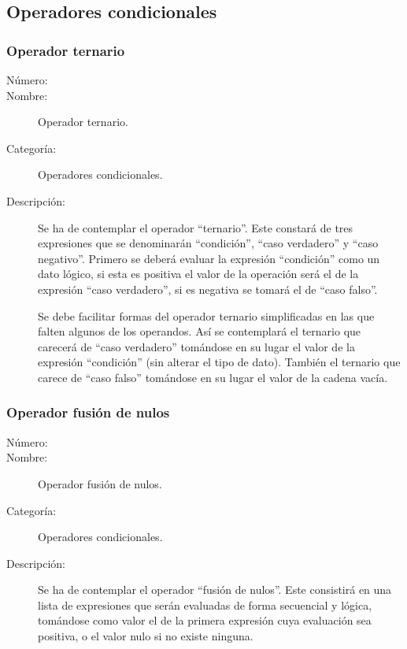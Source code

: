 \subsection{Operadores condicionales}
\subsubsection{Operador ternario}
\begin{framed}
	\begin{description}
		\item [Número:] \cn
		\item [Nombre:] Operador ternario.
		\item [Categoría:] Operadores condicionales.
		\item [Descripción:] Se ha de contemplar el operador ``ternario''. Este constará de tres expresiones que se denominarán
		``condición'', ``caso verdadero'' y ``caso negativo''. Primero se deberá evaluar la expresión ``condición'' como un
		dato lógico, si esta es positiva el valor de la operación será el de la expresión ``caso verdadero'', si es negativa
		se tomará el de ``caso falso''.
		
		Se debe facilitar formas del operador ternario simplificadas en las que falten algunos
		de los operandos. Así se contemplará el ternario que carecerá de ``caso verdadero'' tomándose en su lugar
		el valor de la expresión ``condición'' (sin alterar el tipo de dato). También el ternario que carece de ``caso falso''
		tomándose en su lugar el valor de la cadena vacía.
	\end {description}
\end{framed}

\subsubsection{Operador fusión de nulos}
\begin{framed}
	\begin{description}
		\item [Número:] \cn
		\item [Nombre:] Operador fusión de nulos.
		\item [Categoría:] Operadores condicionales.
		\item [Descripción:] Se ha de contemplar el operador ``fusión de nulos''. Este consistirá en una lista de expresiones que serán
		evaluadas de forma secuencial y lógica, tomándose como valor el de la primera expresión
		cuya evaluación sea positiva, o el valor nulo si no existe ninguna.
	\end {description}
\end{framed}
